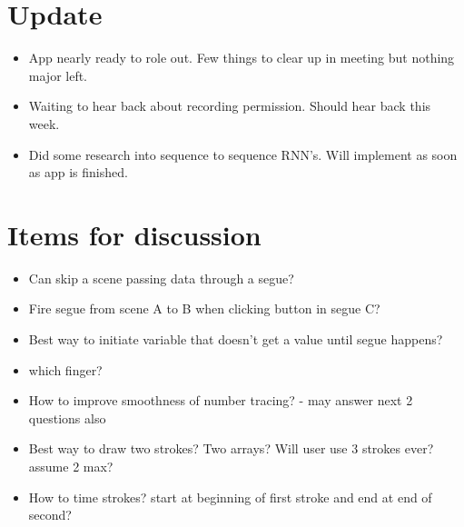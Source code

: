 \documentclass[]{weekly-report}
\begin{document}

\def\studentname{Philip Corr}
\def\projecttitle{ConvNets for iOS Gesture Recognition Applications}
\def\ucdstudentnumber{12318581}
\def\weeklyreportnumber{7}
\maketitle


\section{Update}

\begin{itemize}

\item App nearly ready to role out. Few things to clear up in meeting but nothing major left.

\item Waiting to hear back about recording permission. Should hear back this week.

\item Did some research into sequence to sequence RNN's. Will implement as soon as app is finished.
	
\end{itemize}

\section{Items for discussion}

\begin{itemize}
\item Can skip a scene passing data through a segue?

\item Fire segue from scene A to B when clicking button in segue C?

\item Best way to initiate variable that doesn’t get a value until segue happens?

\item which finger?

\item How to improve smoothness of number tracing? - may answer next 2 questions also

\item Best way to draw two strokes? Two arrays? Will user use 3 strokes ever? assume 2 max?

\item How to time strokes? start at beginning of first stroke and end at end of second?

\end{itemize}
\end{document}
